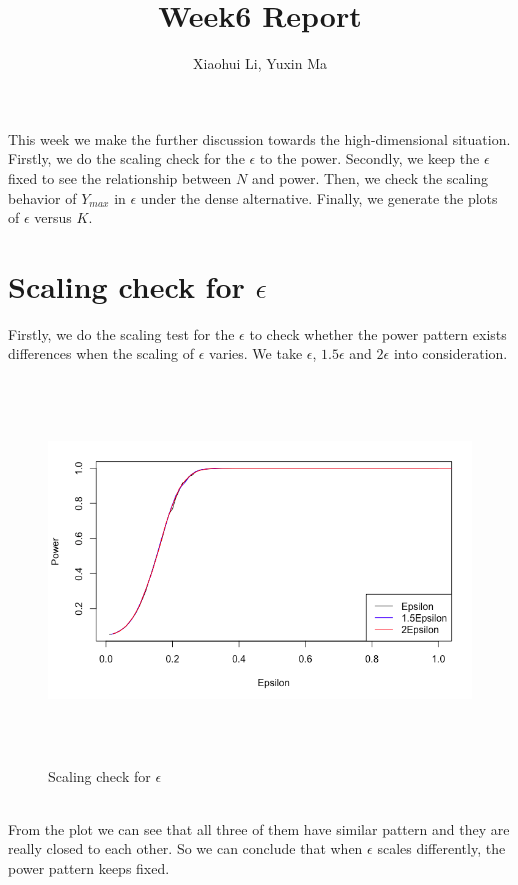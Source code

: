 \documentclass[10pt,english]{article}\usepackage{graphicx, color}
\numberwithin{equation}{section}
\numberwithin{figure}{section}
\begin{document}
\title{Week6 Report}


\author{Xiaohui Li, Yuxin Ma}

\maketitle

This week we make the further discussion towards the high-dimensional situation. Firstly, we do the scaling check for the $\epsilon$ to the power. Secondly, we keep the $\epsilon$ fixed to see the relationship between $N$ and power. Then, we check the scaling behavior of $Y_{max}$ in $\epsilon$ under the dense alternative. Finally, we generate the plots of $\epsilon$ versus $K$. 

\section{Scaling check for $\epsilon$}
Firstly, we do the scaling test for the $\epsilon$ to check whether the power pattern exists differences when the scaling of $\epsilon$ varies. We take $\epsilon$, $1.5\epsilon$ and $2\epsilon$ into consideration.\\
\begin{figure}[htbp]
\centering\includegraphics[width=6in, height=4in]{scale}
\caption{Scaling check for $\epsilon$}
\end{figure}
\quad\\
From the plot we can see that all three of them have similar pattern and they are really closed to each other. So we can conclude that when $\epsilon$ scales differently, the power pattern keeps fixed.
\end{document}
